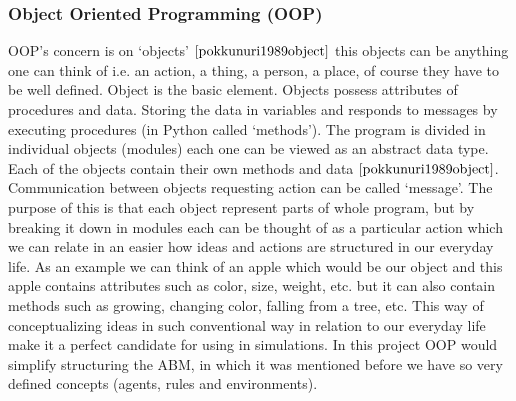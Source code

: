 \documentclass{book}
\begin{document}
\subsubsection{Object Oriented Programming (OOP)} \label{OOP}
OOP's concern is on `objects' $\cite{pokkunuri1989object}$ this objects can be anything one can think of i.e. an action, a thing, a person, a place, of course they have to be well defined. Object is the basic element. Objects possess attributes of procedures and data. Storing the data in variables and responds to messages by executing procedures (in Python called ‘methods’). The program is divided in individual objects (modules) each one can be viewed as an abstract data type. Each of the objects contain their own methods and data $\cite{pokkunuri1989object}$. Communication between objects requesting action can be called ‘message’. The purpose of this is that each object represent parts of whole program, but by breaking it down in modules each can be thought of as a particular action which we can relate in an easier how ideas and actions are structured in our everyday life. As an example we can think of an apple which would be our object and this apple contains attributes such as color, size, weight, etc. but it can also contain methods such as growing, changing color, falling from a tree, etc. This way of conceptualizing ideas in such conventional way in relation to our everyday life make it a perfect candidate for using in simulations. In this project OOP would simplify structuring the ABM, in which it was mentioned before we have so very defined concepts (agents, rules and environments). 
\end{document}
